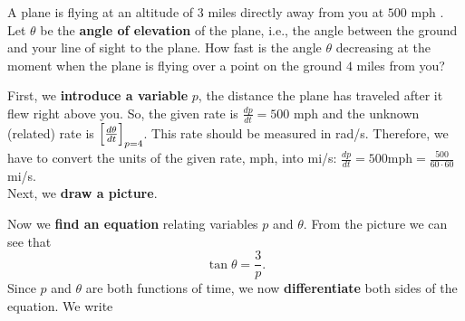 \documentclass{ximera}
\begin{document}
\author{Nela Lakos}
\begin{example}
A plane is flying at an altitude of $3$ miles directly away from you at $500$ mph 
.  Let  $\theta$ be the \textbf{angle of elevation} of the plane, i.e., the angle between the ground and your line of  sight to the plane.
How fast is the angle $\theta$  decreasing at
the moment when the plane is flying over a point on the ground $4$
miles from you?


\begin{explanation}
 First, we \textbf{introduce a variable} $p$, the distance the plane has traveled after it flew right above you. 
 So, the given rate is $\frac{dp}{dt}=500$ mph and the unknown (related) rate is $\Bigl [\frac{d\theta}{dt}\Bigr]_{p=4}$.
  This rate should be measured in rad/s.
  Therefore, we have to convert the units of the given rate, mph, into mi/s:
    $\frac{dp}{dt}=500$mph$=\frac{500}{60\cdot60}$ mi/s. \\
Next, we \textbf{draw a picture}.
\begin{image}
\end{image}
Now we  \textbf{find an equation} relating variables $p$ and $\theta$.
From the picture we can see that
\[
\tan{\theta}=\frac{3}{p}.
\] 
Since  $p$ and $\theta$ are both functions of time, we now
\textbf{differentiate} both sides of the equation. We write

\end{explanation}
\end{example}
\end{document}

